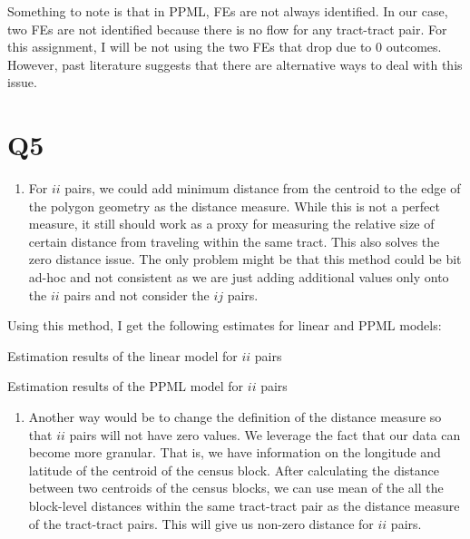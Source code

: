 \documentclass[
  11pt]{article}
\providecommand{\tightlist}{%
  \setlength{\itemsep}{0pt}\setlength{\parskip}{0pt}}
\begin{document}
Something to note is that in PPML, FEs are not always identified. In our
case, two FEs are not identified because there is no flow for any
tract-tract pair. For this assignment, I will be not using the two FEs
that drop due to 0 outcomes. However, past literature suggests that
there are alternative ways to deal with this issue.

\section*{Q5}\label{q5}

\begin{enumerate}
\def\labelenumi{\arabic{enumi}.}
\tightlist
\item
  For \(ii\) pairs, we could add minimum distance from the centroid to
  the edge of the polygon geometry as the distance measure. While this
  is not a perfect measure, it still should work as a proxy for
  measuring the relative size of certain distance from traveling within
  the same tract. This also solves the zero distance issue. The only
  problem might be that this method could be bit ad-hoc and not
  consistent as we are just adding additional values only onto the
  \(ii\) pairs and not consider the \(ij\) pairs.
\end{enumerate}

Using this method, I get the following estimates for linear and PPML
models:

\begin{table}[!ht]
\centering
\caption{Estimation results of the linear model for $ii$ pairs}
\label{tab:est_linear_ii}

\end{table}

\begin{table}[!ht]
\centering
\caption{Estimation results of the PPML model for $ii$ pairs}
\label{tab:est_ppml_ii}

\end{table}

\begin{enumerate}
\def\labelenumi{\arabic{enumi}.}
\setcounter{enumi}{1}
\tightlist
\item
  Another way would be to change the definition of the distance measure
  so that \(ii\) pairs will not have zero values. We leverage the fact
  that our data can become more granular. That is, we have information
  on the longitude and latitude of the centroid of the census block.
  After calculating the distance between two centroids of the census
  blocks, we can use mean of the all the block-level distances within
  the same tract-tract pair as the distance measure of the tract-tract
  pairs. This will give us non-zero distance for \(ii\) pairs.
\end{enumerate}
\end{document}
